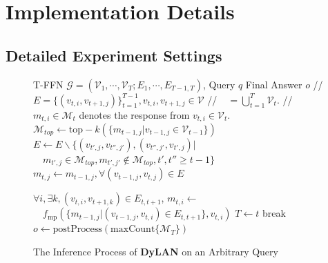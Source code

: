 \documentclass{article} %
\begin{document}
\section{Implementation Details}\label{app:all-a}

\subsection{Detailed Experiment Settings} \label{app:a}

\begin{figure}[htb]
  \centering
  \small
  \begin{minipage}[t]{.57\linewidth}
\begin{algorithm}[H]
\caption{The Inference Process of \textbf{DyLAN} on an Arbitrary Query}\label{alg:try}
\begin{algorithmic}
 T-FFN $\mathcal{G}=(\mathcal{V}_1,\cdots, \mathcal{V}_T; E_1, \cdots, E_{T-1, T})$, Query $q$
 Final Answer $o$
\STATE // $E = \{(v_{t,i}, v_{t+1, j})\}_{t=1}^{T-1}, v_{t,i}, v_{t+1, j} \in \mathcal{V} $
\STATE // $\phantom{E} = \bigcup_{t=1}^{T} \mathcal{V}_t$.
\STATE // $m_{t,i} \in \mathcal{M}_t$ denotes the response from $v_{t,i}\in\mathcal{V}_t$.
\STATE $\mathcal{M}_{top} \gets \mathrm{top-}k(\{ m_{t-1,j} | v_{t-1, j} \in \mathcal{V}_{t-1}\})$\;
\STATE $E \gets E \backslash \{(v_{t',j},v_{t'',j'}),(v_{t'', j'},v_{t',j})|$ \; 
\STATE $ \quad m_{t',j}\in\mathcal{M}_{top}, m_{t', j'}\notin\mathcal{M}_{top}, t', t''\geq t-1\}$\;
\STATE $m_{t,j} \gets m_{t-1,j}, \forall (v_{t-1, j}, v_{t, j}) \in E $\;

\ELSE 
\STATE $\forall i, \exists k, (v_{t,i}, v_{t+1,k}) \in E_{t, t+1}$, \;
\STATE $m_{t,i} \gets $\;
\STATE $ \quad f_{\mathrm{mp}}(\{m_{t-1, j} | (v_{t-1, j}, v_{t, i}) \in E_{t, t+1} \}, v_{t,i}) $ \;
\ENDIF
{}
\STATE $ T \gets t$ \;
\STATE break\;
\ENDIF
\ENDFOR
\STATE $o \gets \mathrm{postProcess} (\mathrm{maxCount} \{\mathcal{M}_{T}\})$\;



\end{algorithmic}
\end{algorithm}
\end{minipage}
\end{figure}
\end{document}
